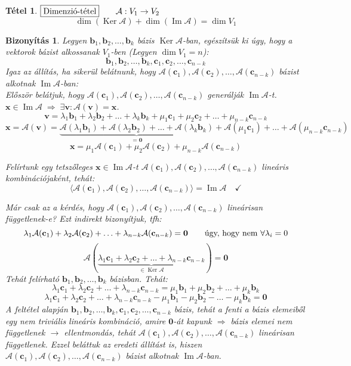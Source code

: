 \documentclass[a4paper,12pt,twoside]{book}
\newcommand{\vek}[1]{\mathbf{#1}} %
\newcommand{\ve}[2]{\mathbf{#1}_{#2}} %
\newcommand{\lista}[2]{{#1}_{1}, {#1}_{2}, \ldots, {#1}_{#2}}
\newcommand{\gen}[1]{\langle #1 \rangle}
\newcommand{\linkomb}[3]{#2_1\vek{#1}_{1} + #2_2\vek{#1}_{2} + \ldots + #2_{#3}\vek{#1}_{#3}}
\DeclareMathOperator{\Ker}{Ker}
\DeclareMathOperator{\Ima}{Im}
\newtheorem{tetel}{Tétel}[chapter]
\newtheorem{biz}{Bizonyítás}[chapter]
\theoremstyle{break}
\begin{document}
\begin{tetel} $\boxed{$Dimenzió-tétel$} \qquad \mathcal{A}: V_1 \to V_2$ \\
  \[ \dim( \Ker \mathcal{A} ) + \dim( \Ima \mathcal{A} ) = \dim V_1 \]
\end{tetel}
\begin{biz}
 Legyen $\lista{\vek{b}}{k}$ bázis $\Ker \mathcal{A}$-ban, egészítsük ki úgy, hogy a vektorok bázist alkossanak $V_1$-ben (Legyen $\dim V_1 = n$):
 \[\lista{\vek{b}}{k}, \lista{\vek{c}}{n-k}\]
 Igaz az állítás, ha sikerül belátnunk, hogy $\mathcal{A}(\ve{c}{1}), \mathcal{A}(\ve{c}{2}), \ldots, \mathcal{A}(\ve{c}{n-k})$ bázist alkotnak $\Ima \mathcal{A}$-ban: \\

 Először belátjuk, hogy $\mathcal{A}(\ve{c}{1}), \mathcal{A}(\ve{c}{2}), \ldots, \mathcal{A}(\ve{c}{n-k})$ generálják $\Ima \mathcal{A}$-t. $\vek{x}\in\Ima \mathcal{A} \; \Rightarrow \; \exists \vek{v} : \mathcal{A}(\vek{v}) = \vek{x}$.
 \[\vek{v} = \linkomb{b}{\lambda}{k}+\linkomb{c}{\mu}{n-k}\]
 \[\vek{x} = \mathcal{A}(\vek{v}) = \underbrace{\mathcal{A}(\lambda_1\vek{b}_1)+\mathcal{A}(\lambda_2\vek{b}_2)+\ldots+\mathcal{A}(\lambda_k\vek{b}_k)}_{= \vek{0}}+\mathcal{A}(\mu_1\vek{c}_1)+\ldots+\mathcal{A}(\mu_{n-k}\vek{c}_{n-k})\]
 \[\vek{x} = \mu_1\mathcal{A}(\vek{c}_1)+ \mu_2\mathcal{A}(\vek{c}_2) + \mu_{n-k}\mathcal{A}(\vek{c}_{n-k})\]

 Felírtunk egy tetszőleges $\vek{x}\in\Ima \mathcal{A}$-t $\mathcal{A}(\ve{c}{1}), \mathcal{A}(\ve{c}{2}), \ldots, \mathcal{A}(\ve{c}{n-k})$ lineáris kombinációjaként, tehát:
 \[\gen{ \mathcal{A}(\ve{c}{1}), \mathcal{A}(\ve{c}{2}), \ldots, \mathcal{A}(\ve{c}{n-k}) } = \Ima \mathcal{A} \quad \checkmark\]

 Már csak az a kérdés, hogy $\mathcal{A}(\ve{c}{1}), \mathcal{A}(\ve{c}{2}), \ldots, \mathcal{A}(\ve{c}{n-k})$ lineárisan függetlenek-e? Ezt indirekt bizonyítjuk, tfh:
 \[\lambda_1\mathcal{A}(\ve{c}{1}) + \lambda_2\mathcal{A}(\ve{c}{2}) + \ldots + \lambda_{n-k}\mathcal{A}(\ve{c}{n-k}) = \vek{0} \qquad \hbox{úgy, hogy nem $\forall \lambda_i = 0$}\]
  \[\mathcal{A}(\underbrace{\linkomb{c}{\lambda}{n-k}}_{\in \Ker \mathcal{A}}) = \vek{0}\]
 Tehát felírható $\lista{\vek{b}}{k}$ bázisban. Tehát:
 \[\linkomb{\vek{c}}{\lambda}{n-k} = \linkomb{b}{\mu}{k}\]
 \[\linkomb{\vek{c}}{\lambda}{n-k} -\mu_1 \vek{b}_1 - \mu_2 \vek{b}_2 - \ldots - \mu_k \vek{b}_k = \vek{0}\]
 A feltétel alapján $\lista{\vek{b}}{k}, \lista{\vek{c}}{n-k}$ bázis, tehát a fenti a bázis elemeiből egy nem triviális lineáris kombináció, amire $\vek{0}$-át kapunk $\Rightarrow$ bázis elemei nem függetlenek $\rightarrow$ ellentmondás, tehát $\mathcal{A}(\ve{c}{1}), \mathcal{A}(\ve{c}{2}), \ldots, \mathcal{A}(\ve{c}{n-k})$ lineárisan függetlenek. Ezzel beláttuk az eredeti állítást is, hiszen $\mathcal{A}(\ve{c}{1}), \mathcal{A}(\ve{c}{2}), \ldots, \mathcal{A}(\ve{c}{n-k})$ bázist alkotnak $\Ima \mathcal{A}$-ban.
\end{biz}
\end{document}
